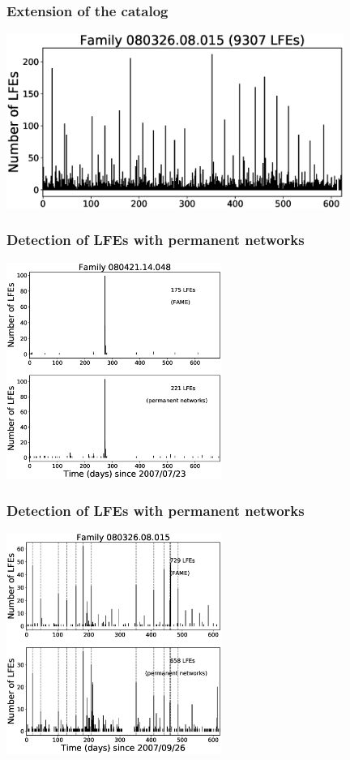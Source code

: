 \documentclass{beamer}
\begin{document}
	\begin{frame}
		\frametitle{Extension of the catalog}
		\begin{center}
			\includegraphics[width=11cm, trim={0cm 0cm 0cm 0cm}, clip]{catalog_SC/08032608015_FAME.eps}
		\end{center}
	\end{frame}

	\begin{frame}
		\frametitle{Detection of LFEs with permanent networks}
		\begin{center}
			\includegraphics[width=7cm, trim={0cm 0cm 0cm 2cm}, clip]{catalog_SC/08042114048_permanent.eps}
		\end{center}
	\end{frame}

	\begin{frame}
		\frametitle{Detection of LFEs with permanent networks}
		\begin{center}
			\includegraphics[width=7cm, trim={0cm 0cm 0cm 2cm}, clip]{catalog_SC/08032608015_permanent.eps}
		\end{center}
	\end{frame}
\end{document}
